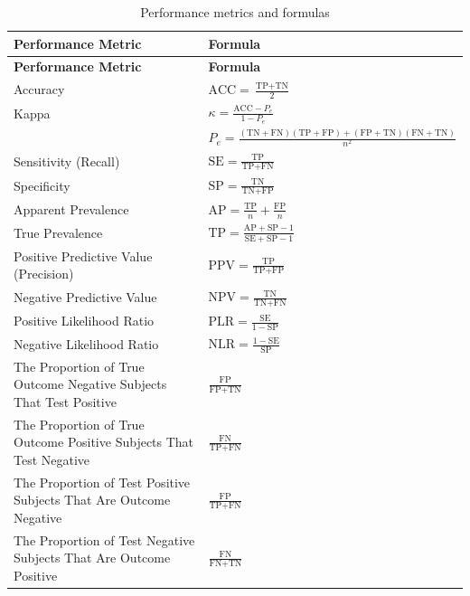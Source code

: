 \begin{longtable}[]{@{}
  >{\raggedright\arraybackslash}p{}
  >{\raggedright\arraybackslash}p{}@{}}
\caption{\label{tab:performance-metrics} Performance metrics and formulas}\tabularnewline
\toprule\noalign{}
\begin{minipage}[b]{\linewidth}\raggedright
\textbf{Performance Metric}
\end{minipage} & \begin{minipage}[b]{\linewidth}\raggedright
\textbf{Formula}
\end{minipage} \\
\midrule\noalign{}
\endfirsthead
\toprule\noalign{}
\begin{minipage}[b]{\linewidth}\raggedright
\textbf{Performance Metric}
\end{minipage} & \begin{minipage}[b]{\linewidth}\raggedright
\textbf{Formula}
\end{minipage} \\
\midrule\noalign{}
\endhead
\bottomrule\noalign{}
\endlastfoot
Accuracy & \(\text{ACC} = \frac{\text{TP} + \text{TN}}{2}\) \\
Kappa & \(\kappa = \frac{\text{ACC} - P_e}{1 - P_e}\) \\
& \(P_e = \frac{(\text{TN} + \text{FN})(\text{TP} + \text{FP}) + (\text{FP} + \text{TN})(\text{FN} + \text{TN})}{n^2}\) \\
Sensitivity (Recall) & \(\text{SE} = \frac{\text{TP}}{\text{TP} + \text{FN}}\) \\
Specificity & \(\text{SP} = \frac{\text{TN}}{\text{TN} + \text{FP}}\) \\
Apparent Prevalence & \(\text{AP} = \frac{\text{TP}}{n} + \frac{\text{FP}}{n}\) \\
True Prevalence & \(\text{TP} = \frac{\text{AP} + \text{SP} - 1}{\text{SE} + \text{SP} - 1}\) \\
Positive Predictive Value (Precision) & \(\text{PPV} = \frac{\text{TP}}{\text{TP} + \text{FP}}\) \\
Negative Predictive Value & \(\text{NPV} = \frac{\text{TN}}{\text{TN} + \text{FN}}\) \\
Positive Likelihood Ratio & \(\text{PLR} = \frac{\text{SE}}{1 - \text{SP}}\) \\
Negative Likelihood Ratio & \(\text{NLR} = \frac{1 - \text{SE}}{\text{SP}}\) \\
The Proportion of True Outcome Negative Subjects That Test Positive & \(\frac{\text{FP}}{\text{FP} + \text{TN}}\) \\
The Proportion of True Outcome Positive Subjects That Test Negative & \(\frac{\text{FN}}{\text{TP} + \text{FN}}\) \\
The Proportion of Test Positive Subjects That Are Outcome Negative & \(\frac{\text{FP}}{\text{TP} + \text{FN}}\) \\
The Proportion of Test Negative Subjects That Are Outcome Positive & \(\frac{\text{FN}}{\text{FN} + \text{TN}}\) \\
\end{longtable}

